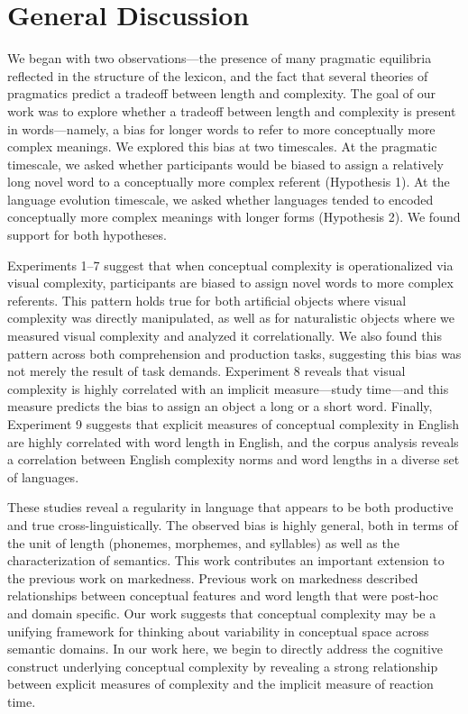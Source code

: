 \documentclass[man]{apa2}
\begin{document}
\section{General Discussion}

We began with two observations---the presence of many pragmatic equilibria reflected in the structure of the lexicon, and the fact that several theories of pragmatics predict a tradeoff between length and complexity. The goal of our work was to explore whether a tradeoff between length and complexity is present in words---namely, a bias for longer words to refer to more conceptually more complex meanings. We explored this bias at two timescales. At the pragmatic timescale, we asked whether participants would be biased to assign a relatively long novel word to a conceptually more complex referent (Hypothesis 1). At the language evolution timescale, we asked whether languages tended to encoded conceptually more complex meanings with longer forms (Hypothesis 2). We found support for both hypotheses.

Experiments 1--7 suggest that when conceptual complexity is operationalized via visual complexity, participants are biased to assign novel words to more complex referents. This pattern holds true for both artificial objects where visual complexity was directly manipulated, as well as for naturalistic objects where we measured visual complexity and analyzed it correlationally. We also found this pattern across both comprehension and production tasks, suggesting this bias was not merely the result of task demands. Experiment 8 reveals that visual complexity is highly correlated with an implicit measure---study time---and this measure predicts the bias to assign an object a long or a short word. Finally, Experiment 9 suggests that explicit measures of conceptual complexity in English are highly correlated with word length in English, and the corpus analysis reveals a correlation between English complexity norms and word lengths in a diverse set of languages.

These studies reveal a regularity in language that appears to be both productive and true cross-linguistically. The observed bias is highly general, both in terms of the unit of length (phonemes, morphemes, and syllables) as well as the characterization of semantics. This work contributes an important extension to the previous work on markedness. Previous work on markedness described relationships between conceptual features and word length that were post-hoc and domain specific. Our work suggests that conceptual complexity may be a unifying framework for thinking about variability in conceptual space across semantic domains. In our work here, we begin to directly address the cognitive construct underlying conceptual complexity by revealing a strong relationship between explicit measures of complexity and the implicit measure of reaction time.
\end{document}
